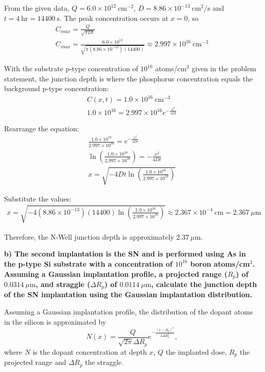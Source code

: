 From the given data, $Q = 6.0 \times 10^{12} \ \mathrm{cm^{-2}}$, $D = 8.86 \times 10^{-13} \ \mathrm{cm^2/s}$ and $t = 4 \ \mathrm{hr} = 14400 \ \mathrm{s}$. The peak concentration occurs at $x=0$, so
\begin{gather*}
    C_{max}=\frac{Q}{\sqrt{\pi Dt}} \\
    C_{max}=\frac{6.0 \times 10^{12}}{\sqrt{\pi(8.86 \times 10^{-13})(14400)}} \approx 2.997 \times 10^{16} \ \mathrm{cm^{-3}}
\end{gather*}

With the substrate p-type concentration of $10^{16}$ atoms/cm$^3$ given in the problem statement, the junction depth is where the phosphorus concentration equals the background p-type concentration:
\begin{gather*}
    C(x,t)=1.0 \times 10^{16} \ \mathrm{cm^{-3}} \\
    1.0 \times 10^{16} = 2.997 \times 10^{16}e^{-\frac{x^2}{4Dt}}
\end{gather*}

Rearrange the equation:
\begin{gather*}
    \frac{1.0 \times 10^{16}}{2.997 \times 10^{16}} = e^{-\frac{x^2}{4Dt}} \\
    \ln \left(\frac{1.0 \times 10^{16}}{2.997 \times 10^{16}}\right) = -\frac{x^2}{4Dt} \\
    x = \sqrt{-4Dt \ln \left(\frac{1.0 \times 10^{16}}{2.997 \times 10^{16}}\right)}
\end{gather*}

Substitute the values:
\begin{gather*}
    x = \sqrt{-4(8.86 \times 10^{-13})(14400)
    \ln \left(\frac{1.0 \times 10^{16}}{2.997 \times 10^{16}}\right)} \approx 2.367 \times 10^{-4} \ \mathrm{cm} = 2.367 \ \mu\mathrm{m}
\end{gather*}

Therefore, the N-Well junction depth is approximately $2.37~\mu\mathrm{m}$.


\vspace{0.5em}
\noindent \textbf{b) The second implantation is the SN and is performed using As in the p-type Si substrate with a concentration of $10^{16}$ boron atoms/cm$^3$. Assuming a Gaussian implantation profile, a projected range ($R_p$) of $0.0314 \ \mu\mathrm{m}$, and straggle ($\Delta R_p$) of $0.0114 \ \mu\mathrm{m}$, calculate the junction depth of the SN implantation using the Gaussian implantation distribution.}

Assuming a Gaussian implantation profile, the distribution of the dopant atoms in the silicon is approximated by
\begin{equation}
    N(x)=\frac{Q}{\sqrt{2\pi}\Delta R_p}e^{-\frac{(x-R_p)^2}{2\Delta R_p^2}},
    \label{eq:gauss-implant}
\end{equation}
where $N$ is the dopant concentration at depth $x$, $Q$ the implanted dose, $R_p$ the projected range and $\Delta R_p$ the straggle.

